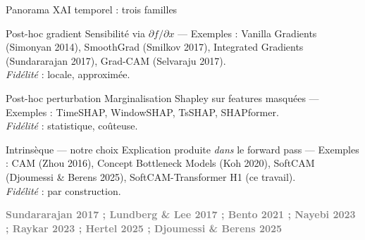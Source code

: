 \documentclass[10pt]{beamer}
\newcommand{\source}[1]{\vspace{4pt}\hfill{\textcolor{gray}{\textbf{\tiny #1}}}}
\begin{document}
\begin{frame}{Panorama XAI temporel : trois familles}
\vspace{-2pt}
{\small
  \begin{block}{Post-hoc gradient}
    \vspace{-2pt}
    Sensibilité via $\partial f / \partial x$ — Exemples : Vanilla Gradients (Simonyan 2014), SmoothGrad (Smilkov 2017), Integrated Gradients (Sundararajan 2017), Grad-CAM (Selvaraju 2017).\\[-2pt]
    \emph{Fidélité} : locale, approximée.
    \vspace{-2pt}
  \end{block}

\vspace{2pt}
  \begin{block}{Post-hoc perturbation}
    \vspace{-2pt}
    Marginalisation Shapley sur features masquées — Exemples : TimeSHAP, WindowSHAP, TsSHAP, SHAPformer.\\[-2pt]
    \emph{Fidélité} : statistique, coûteuse.
    \vspace{-2pt}
  \end{block}

\vspace{2pt}
  \begin{exampleblock}{Intrinsèque --- notre choix}
    \vspace{-2pt}
    Explication produite \emph{dans} le forward pass — Exemples : CAM (Zhou 2016), Concept Bottleneck Models (Koh 2020), SoftCAM (Djoumessi \& Berens 2025), \alert{SoftCAM-Transformer H1} (ce travail).\\[-2pt]
    \emph{Fidélité} : par construction.
    \vspace{-2pt}
  \end{exampleblock}
}
  \source{Sundararajan 2017 ; Lundberg \& Lee 2017 ; Bento 2021 ; Nayebi 2023 ; Raykar 2023 ; Hertel 2025 ; Djoumessi \& Berens 2025}
\end{frame}
\end{document}
